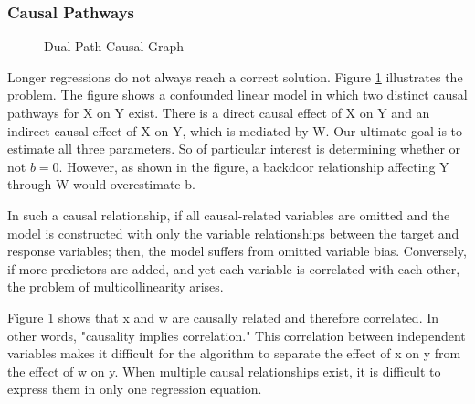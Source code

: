 \documentclass{article}\usepackage[]{graphicx}\usepackage[]{xcolor}
\begin{document}
\newpage
\subsubsection*{Causal Pathways}

\begin{figure}[htp]
\centering
{}
\caption{Dual Path Causal Graph}
\label{fig:mult}
\end{figure}

Longer regressions do not always reach a correct solution.
Figure \ref{fig:mult} illustrates the problem. 
The figure shows a confounded linear model in which two distinct causal pathways for X on Y exist. 
There is a direct causal effect of X on Y and an indirect causal effect of X on Y, which is mediated by W.
Our ultimate goal is to estimate all three parameters. 
So of particular interest is determining whether or not $b = 0$.
However, as shown in the figure, a backdoor relationship affecting Y through W would overestimate b.

In such a causal relationship, 
if all causal-related variables are omitted and 
the model is constructed with only the variable relationships between the target and response variables; then, the model suffers from omitted variable bias.
Conversely, if more predictors are added, and yet each variable is correlated with each other, 
the problem of multicollinearity arises.

Figure \ref{fig:mult} shows that x and w are causally related and therefore correlated. 
In other words, "causality implies correlation." 
This correlation between independent variables makes it difficult for the algorithm to separate the effect of x on y from the effect of w on y.
When multiple causal relationships exist, it is difficult to express them in only one regression equation.

\end{document}
